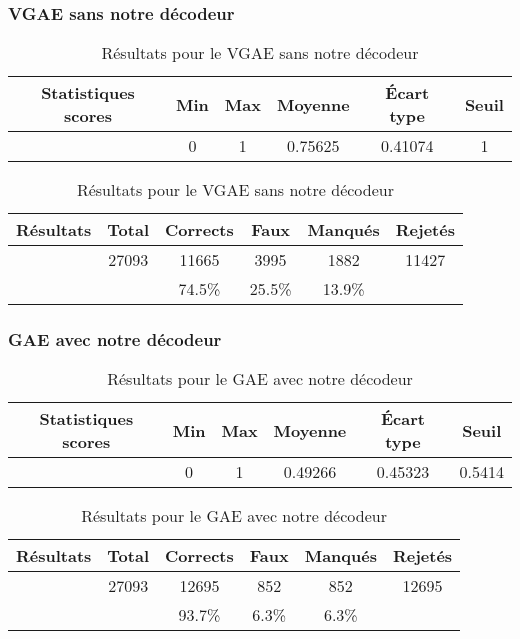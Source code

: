 \documentclass{article}
\begin{document}
\subsubsection{VGAE sans notre décodeur}

\begin{table}
    \centering
    \begin{tabular}{|c|c|c|c|c|c|}
        \hline
        Statistiques scores & Min & Max & Moyenne & Écart type & Seuil\\
        \hline
         & 0 & 1 & 0.75625 & 0.41074 & 1 \\
         \hline
    \end{tabular}
    \begin{tabular}{|c|c|c|c|c|c|}
        \hline
        Résultats & Total & Corrects & Faux & Manqués & Rejetés\\
        \hline
         & 27093 & 11665 & 3995 & 1882 & 11427\\
        \hline
         &  & 74.5\% & 25.5\% & 13.9\% & \\
        \hline
    \end{tabular}
    \caption{Résultats pour le VGAE sans notre décodeur}
    \label{tab:my_label}
\end{table}

\subsubsection{GAE avec notre décodeur}

\begin{table}
    \centering
    \begin{tabular}{|c|c|c|c|c|c|}
        \hline
        Statistiques scores & Min & Max & Moyenne & Écart type & Seuil\\
        \hline
         & 0 & 1 & 0.49266 & 0.45323 & 0.5414 \\
         \hline
    \end{tabular}
    \begin{tabular}{|c|c|c|c|c|c|}
        \hline
        Résultats & Total & Corrects & Faux & Manqués & Rejetés\\
        \hline
         & 27093 & 12695 & 852 & 852 & 12695\\
        \hline
         &  & 93.7\% & 6.3\% & 6.3\% & \\
        \hline
    \end{tabular}
    \caption{Résultats pour le GAE avec notre décodeur}
    \label{tab:my_label}
\end{table}
\end{document}

